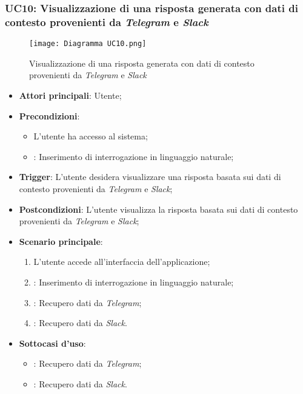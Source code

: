 \newpage
\hypertarget{UC10}{}
\subsubsection{UC10: Visualizzazione di una risposta generata con dati di contesto provenienti da \emph{Telegram} e \emph{Slack}}

\begin{figure}[h]
    \centering
    \texttt{[image: Diagramma UC10.png]}
    \caption{Visualizzazione di una risposta generata con dati di contesto provenienti da \emph{Telegram} e \emph{Slack}}
\end{figure}

\begin{itemize}
    \item \textbf{Attori principali}: Utente;
    \item \textbf{Precondizioni}: 
    \begin{itemize}
        \item L'utente ha accesso al sistema;
        \item {}: Inserimento di interrogazione in linguaggio naturale;
    \end{itemize}
    \item \textbf{Trigger}: L'utente desidera visualizzare una risposta basata sui dati di contesto provenienti da \emph{Telegram} e \emph{Slack};
    \item \textbf{Postcondizioni}: L'utente visualizza la risposta basata sui dati di contesto provenienti da \emph{Telegram} e \emph{Slack};
    \item \textbf{Scenario principale}:
    \begin{enumerate}
        \item L'utente accede all'interfaccia dell'applicazione;
        \item {}: Inserimento di interrogazione in linguaggio naturale;
        \item {}: Recupero dati da \emph{Telegram};
        \item {}: Recupero dati da \emph{Slack}.
    \end{enumerate}
    \item \textbf{Sottocasi d'uso}:
    \begin{itemize}
        \item {}: Recupero dati da \emph{Telegram};
        \item {}: Recupero dati da \emph{Slack}.

\end{itemize}
\end{itemize}
